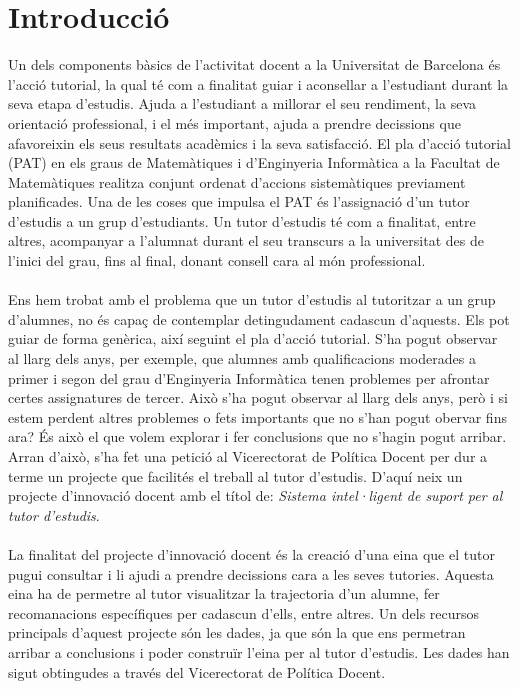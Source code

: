 \documentclass[12pt,a4paper,catalan]{article}
\begin{document}
\newpage 

\addto\captionsenglish{
  \renewcommand{\contentsname}%
    {Índex}%
}


{\hypersetup{linkcolor=black}
	\thispagestyle{empty}
	\tableofcontents
	\thispagestyle{empty}
}

\newpage

\setcounter{page}{1}


\section{Introducció}
Un dels components bàsics de l'activitat docent a la Universitat de Barcelona és l'acció tutorial, la qual té com a finalitat guiar i aconsellar a l'estudiant durant la seva etapa d'estudis. Ajuda a l'estudiant a millorar el seu rendiment, la seva orientació professional, i el més important, ajuda a prendre decissions que afavoreixin els seus resultats acadèmics i la seva satisfacció. El pla d'acció tutorial (PAT) en els graus de Matemàtiques i d'Enginyeria Informàtica a la Facultat de Matemàtiques realitza conjunt ordenat d'accions sistemàtiques previament planificades. Una de les coses que impulsa el PAT és l'assignació d'un tutor d'estudis a un grup d'estudiants. Un tutor d'estudis té com a finalitat, entre altres, acompanyar a l'alumnat durant el seu transcurs a la universitat des de l'inici del grau, fins al final, donant consell cara al món professional.
\\
\\
Ens hem trobat amb el problema que un tutor d'estudis al tutoritzar a un grup d'alumnes, no és capaç de contemplar detingudament cadascun d'aquests. Els pot guiar de forma genèrica, així seguint el pla d'acció tutorial. S'ha pogut observar al llarg dels anys, per exemple, que alumnes amb qualificacions moderades a primer i segon del grau d'Enginyeria Informàtica tenen problemes per afrontar certes assignatures de tercer. Això s'ha pogut observar al llarg dels anys, però i si estem perdent altres problemes o fets importants que no s'han pogut obervar fins ara? És això el que volem explorar i fer conclusions que no s'hagin pogut arribar. Arran d'això, s'ha fet una petició al Vicerectorat de Política Docent per dur a terme un projecte que facilités el treball al tutor d'estudis. D'aquí neix un projecte d'innovació docent amb el títol de: \textit{Sistema intel·ligent de suport per al tutor d'estudis}.
\\
\\
La finalitat del projecte d'innovació docent és la creació d'una eina que el tutor pugui consultar i li ajudi a prendre decissions cara a les seves tutories. Aquesta eina ha de permetre al tutor visualitzar la trajectoria d'un alumne, fer recomanacions específiques per cadascun d'ells, entre altres. Un dels recursos principals d'aquest projecte són les dades, ja que són la que ens permetran arribar a conclusions i poder construïr l'eina per al tutor d'estudis. Les dades han sigut obtingudes a través del Vicerectorat de Política Docent.
\end{document}
